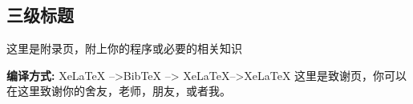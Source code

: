 \documentclass{LZUthesis}
\begin{document}
\subsection{三级标题}




\backmatter


\printbib




\Appendix


这里是附录页，附上你的程序或必要的相关知识\cite{partl2016}

{\bfseries 编译方式:} XeLaTeX -->BibTeX --> XeLaTeX-->XeLaTeX
\Thanks
这里是致谢页，你可以在这里致谢你的舍友，老师，朋友，或者我。





\Grade
\end{document}
